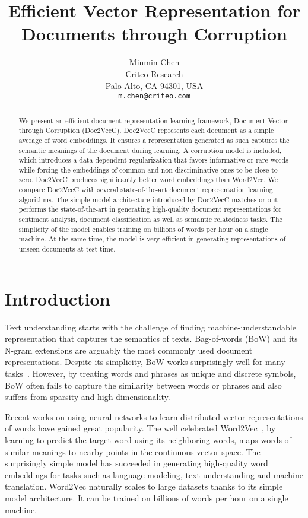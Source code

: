 \documentclass{article} \usepackage{iclr2017_conference,times}
\title{Efficient Vector Representation for Documents through Corruption}
\author{Minmin Chen \\
Criteo Research\\
Palo Alto, CA 94301, USA \\
\texttt{m.chen@criteo.com} \\
}
\newcommand{\name}{Doc2VecC}
\begin{document}
\maketitle

\begin{abstract}
We present an efficient document representation learning framework, Document Vector through Corruption (\name{}).  \name{} represents each document as a simple average of word embeddings. It ensures a representation generated as such captures the semantic meanings of the document during learning. A corruption model is included, which introduces a data-dependent  regularization that favors informative or rare words while forcing the embeddings of common and non-discriminative ones to be close to zero.  \name{} produces significantly better word embeddings than Word2Vec. We compare \name{} with several state-of-the-art document representation learning algorithms. The simple model architecture introduced by \name{} matches or out-performs the state-of-the-art in generating high-quality document representations for sentiment analysis, document classification as well as semantic relatedness tasks. The simplicity of the model enables training on billions of words per hour on a single machine. At the same time, the model is very efficient in generating representations of unseen documents at test time. \end{abstract}



\section{Introduction}
\label{intro}
Text understanding starts with the challenge of finding machine-understandable representation that captures the semantics of texts. Bag-of-words (BoW) and its N-gram extensions are arguably the most commonly used document representations. Despite its simplicity, BoW works surprisingly well for many tasks~\citep{wang2012baselines}. However, by treating words and phrases as unique and discrete symbols, BoW often fails to capture the similarity between words or phrases and also suffers from sparsity and high dimensionality.


Recent works on using neural networks to learn distributed vector representations of words have gained great popularity. The well celebrated Word2Vec~\citep{mikolov2013efficient}, by learning to predict the target word using its neighboring words, maps words of similar meanings to nearby points in the continuous vector space. The surprisingly simple model has succeeded in generating high-quality word embeddings for tasks such as language modeling, text understanding and machine translation. Word2Vec naturally scales to large datasets thanks to its simple model architecture. It can be trained on billions of words per hour on a single machine. 
\end{document}
